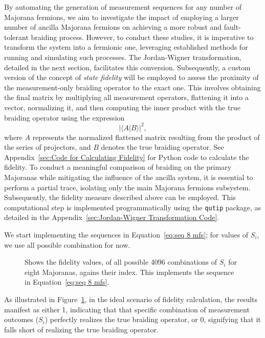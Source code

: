 \documentclass{article}
\begin{document}
\vspace{12pt}
By automating the generation of measurement sequences for any number of Majorana fermions, we aim to investigate the impact of employing a larger number of ancilla Majorana fermions on achieving a more robust and fault-tolerant braiding process. However, to conduct these studies, it is imperative to transform the system into a fermionic one, leveraging established methods for running and simulating such processes. The Jordan-Wigner transformation, detailed in the next section, facilitates this conversion. Subsequently, a custom version of the concept of \textit{state fidelity} will be employed to assess the proximity of the measurement-only braiding operator to the exact one. This involves obtaining the final matrix by multiplying all measurement operators, flattening it into a vector, normalizing it, and then computing the inner product with the true braiding operator using the expression
\[
	|\langle A | B \rangle|^2 ,
\]
where \(A\) represents the normalized flattened matrix resulting from the product of the series of projectors, and \(B\) denotes the true braiding operator. See Appendix~\ref{sec:Code for Calculating Fidelity} for Python code to calculate the fidelity. To conduct a meaningful comparison of braiding on the primary Majoranas while mitigating the influence of the ancilla system, it is essential to perform a partial trace, isolating only the main Majorana fermions subsystem. Subsequently, the fidelity measure described above can be employed. This computational step is implemented programmatically using the \texttt{qutip} package, as detailed in the Appendix~\ref{sec:Jordan-Wigner Transformation Code}.

\vspace{12pt}
We start implementing the sequences in Equation~\ref{eq:seq 8 mfs}; for values of $ S_i $, we use all possible combination for now.
\begin{figure}
	\begin{center}
		
	\end{center}
	\caption{Shows the fidelity values, of all possible 4096 combinations of $ S_i $ for eight Majoranas, agains their index. This implements the sequence in Equation~\ref{eq:seq 8 mfs}.}
	\label{fig:ideal fids all combs}
\end{figure}
As illustrated in Figure~\ref{fig:ideal fids all combs}, in the ideal scenario of fidelity calculation, the results manifest as either 1, indicating that that specific combination of measurement outcomes ($ S_i $) perfectly realizes the true braiding operator, or 0, signifying that it falls short of realizing the true braiding operator.
\end{document}
